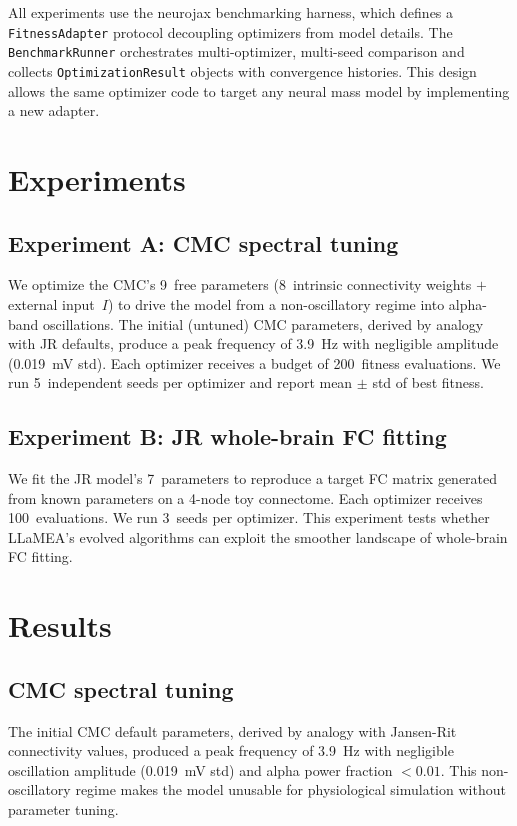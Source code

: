\documentclass[11pt,a4paper]{article}
\begin{document}
All experiments use the neurojax benchmarking harness, which defines a \texttt{FitnessAdapter} protocol decoupling optimizers from model details.
The \texttt{BenchmarkRunner} orchestrates multi-optimizer, multi-seed comparison and collects \texttt{OptimizationResult} objects with convergence histories.
This design allows the same optimizer code to target any neural mass model by implementing a new adapter.


\section{Experiments}

\subsection{Experiment A: CMC spectral tuning}

We optimize the CMC's 9~free parameters (8~intrinsic connectivity weights $+$ external input~$I$) to drive the model from a non-oscillatory regime into alpha-band oscillations.
The initial (untuned) CMC parameters, derived by analogy with JR defaults, produce a peak frequency of 3.9~Hz with negligible amplitude (0.019~mV std).
Each optimizer receives a budget of 200~fitness evaluations.
We run 5~independent seeds per optimizer and report mean $\pm$ std of best fitness.

\subsection{Experiment B: JR whole-brain FC fitting}

We fit the JR model's 7~parameters to reproduce a target FC matrix generated from known parameters on a 4-node toy connectome.
Each optimizer receives 100~evaluations.
We run 3~seeds per optimizer.
This experiment tests whether LLaMEA's evolved algorithms can exploit the smoother landscape of whole-brain FC fitting.

\section{Results}

\subsection{CMC spectral tuning}

The initial CMC default parameters, derived by analogy with Jansen-Rit connectivity values, produced a peak frequency of 3.9~Hz with negligible oscillation amplitude (0.019~mV std) and alpha power fraction $< 0.01$.
This non-oscillatory regime makes the model unusable for physiological simulation without parameter tuning.
\end{document}
